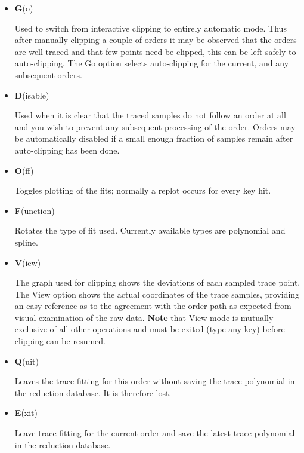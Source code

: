 \documentclass[twoside,11pt,nolof]{starlink}
\newcommand{\sunspec}[2]{#2}
\begin{document}
\begin{itemize}
\item {\sunspec{\Large\tt}{\bf} G}(o)

     Used to switch from interactive clipping to entirely
     automatic mode. Thus after manually clipping a couple of orders
     it may be observed that the orders are well traced and that few
     points need be clipped, this can be left safely to auto-clipping.
     The Go option selects auto-clipping for the current, and any
     subsequent orders.

\item {\sunspec{\Large\tt}{\bf} D}(isable)

     Used when it is clear that the traced samples do not
     follow an order at all and you wish to prevent any subsequent
     processing of the order.  Orders may be automatically disabled
     if a small enough fraction of samples remain after auto-clipping
     has been done.

\item {\sunspec{\Large\tt}{\bf} O}(ff)

     Toggles plotting of the fits; normally a replot occurs for every
     key hit.

\item {\sunspec{\Large\tt}{\bf} F}(unction)

     Rotates the type of fit used.  Currently available types
     are polynomial and spline.

\item {\sunspec{\Large\tt}{\bf} V}(iew)

     The graph used for clipping shows the deviations of each
     sampled trace point. The View option shows the actual coordinates
     of the trace samples, providing an easy reference as to the agreement
     with the order path as expected from visual examination of the raw data.
     {\bf Note} that View mode is mutually exclusive of all other operations
     and must be exited (type any key) before clipping can be resumed.

\item {\sunspec{\Large\tt}{\bf} Q}(uit)

     Leaves the trace fitting for this order without saving
     the trace polynomial in the reduction database. It is therefore
     lost.

\item {\sunspec{\Large\tt}{\bf} E}(xit)

     Leave trace fitting for the current order and save the
     latest trace polynomial in the reduction database.


\end{itemize}
\end{document}
